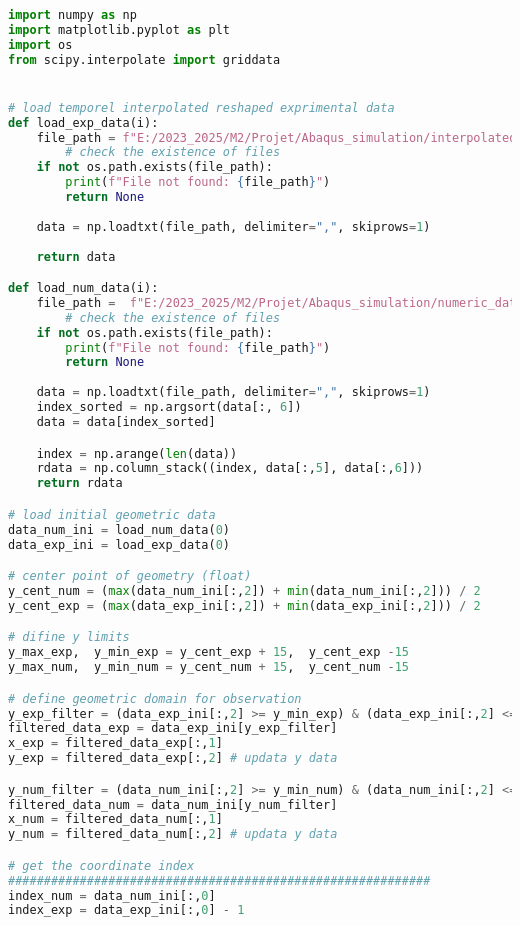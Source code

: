 \documentclass[12pt,a4paper]{article}
\begin{document}
\begin{lstlisting}[language=Python, caption={Superposition en zone utile}]
import numpy as np
import matplotlib.pyplot as plt
import os
from scipy.interpolate import griddata


# load temporel interpolated reshaped exprimental data
def load_exp_data(i):
    file_path = f"E:/2023_2025/M2/Projet/Abaqus_simulation/interpolated_exp_data/image_{i:03}.csv"
        # check the existence of files
    if not os.path.exists(file_path):
        print(f"File not found: {file_path}")
        return None
    
    data = np.loadtxt(file_path, delimiter=",", skiprows=1)
    
    return data

def load_num_data(i):
    file_path =  f"E:/2023_2025/M2/Projet/Abaqus_simulation/numeric_data/champs_deformation/deformation_data_{i}.csv"
        # check the existence of files
    if not os.path.exists(file_path):
        print(f"File not found: {file_path}")
        return None
    
    data = np.loadtxt(file_path, delimiter=",", skiprows=1)
    index_sorted = np.argsort(data[:, 6])
    data = data[index_sorted]

    index = np.arange(len(data))
    rdata = np.column_stack((index, data[:,5], data[:,6]))
    return rdata

# load initial geometric data
data_num_ini = load_num_data(0)
data_exp_ini = load_exp_data(0)

# center point of geometry (float)
y_cent_num = (max(data_num_ini[:,2]) + min(data_num_ini[:,2])) / 2
y_cent_exp = (max(data_exp_ini[:,2]) + min(data_exp_ini[:,2])) / 2

# difine y limits
y_max_exp,  y_min_exp = y_cent_exp + 15,  y_cent_exp -15 
y_max_num,  y_min_num = y_cent_num + 15,  y_cent_num -15

# define geometric domain for observation
y_exp_filter = (data_exp_ini[:,2] >= y_min_exp) & (data_exp_ini[:,2] <= y_max_exp)
filtered_data_exp = data_exp_ini[y_exp_filter]
x_exp = filtered_data_exp[:,1]
y_exp = filtered_data_exp[:,2] # updata y data

y_num_filter = (data_num_ini[:,2] >= y_min_num) & (data_num_ini[:,2] <= y_max_num)
filtered_data_num = data_num_ini[y_num_filter]
x_num = filtered_data_num[:,1]
y_num = filtered_data_num[:,2] # updata y data

# get the coordinate index
###########################################################
index_num = data_num_ini[:,0]
index_exp = data_exp_ini[:,0] - 1 


\end{lstlisting}
\end{document}
